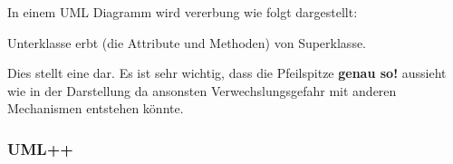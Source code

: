 In einem UML Diagramm wird vererbung wie folgt dargestellt:\\
\noindent
\begin{minipage}{0.6\columnwidth}
\begin{center}
\end{center}
\end{minipage}
\begin{minipage}{0.4\columnwidth}

Unterklasse erbt (die Attribute und Methoden) von Superklasse. 

\end{minipage}

Dies stellt eine  dar. 
Es ist sehr wichtig, dass die Pfeilspitze \colorbox{red!65}{\textbf{genau so!}} aussieht wie in der Darstellung da ansonsten Verwechslungsgefahr mit anderen Mechanismen entstehen könnte.

\subsubsection{UML++}

